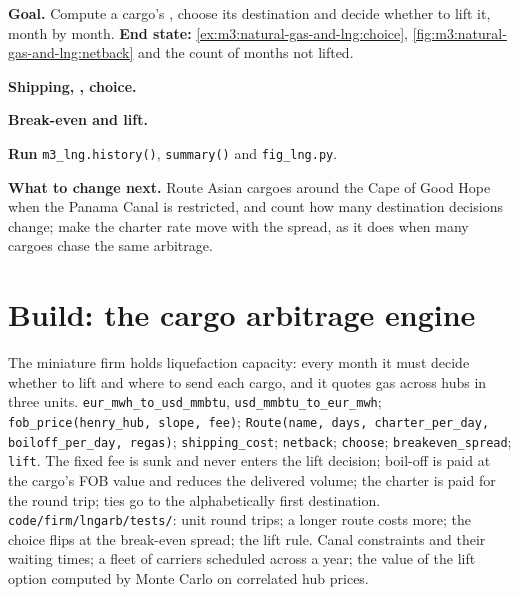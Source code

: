 \begin{tutorial}
\textbf{Goal.} Compute a cargo's , choose its destination and decide whether to
lift it, month by month. \textbf{End state:}
\cref{ex:m3:natural-gas-and-lng:choice}, \cref{fig:m3:natural-gas-and-lng:netback} and
the count of months not lifted.
\begin{tutsteps}
\item \textbf{Shipping, , choice.}
\label{lst:m3:natural-gas-and-lng:netback}
\item \textbf{Break-even and lift.}
\label{lst:m3:natural-gas-and-lng:lift}
\item \textbf{Run} \texttt{m3\_lng.history()}, \texttt{summary()} and \texttt{fig\_lng.py}.
\end{tutsteps}
\textbf{What to change next.} Route Asian cargoes around the Cape of Good Hope when the
Panama Canal is restricted, and count how many destination decisions change; make the
charter rate move with the spread, as it does when many cargoes chase the same arbitrage.
\end{tutorial}

\section{Build: the cargo arbitrage engine}\label{bld:m3:natural-gas-and-lng:lngarb}

\begin{build}
 The miniature firm holds liquefaction capacity: every month it must
decide whether to lift and where to send each cargo, and it quotes gas across hubs in
three units.
 \texttt{eur\_mwh\_to\_usd\_mmbtu}, \texttt{usd\_mmbtu\_to\_eur\_mwh};
\texttt{fob\_price(henry\_hub, slope, fee)}; \texttt{Route(name, days, charter\_per\_day,
boiloff\_per\_day, regas)}; \texttt{shipping\_cost}; \texttt{netback}; \texttt{choose};
\texttt{breakeven\_spread}; \texttt{lift}.
 The fixed fee is sunk and never enters the lift decision; boil-off is paid
at the cargo's FOB value and reduces the delivered volume; the charter is paid for the
round trip; ties go to the alphabetically first destination.
 \texttt{code/firm/lngarb/tests/}: unit round trips; a longer
route costs more; the choice flips at the break-even spread; the lift rule.
 Canal constraints and their waiting times; a fleet of carriers
scheduled across a year; the value of the lift option computed by Monte Carlo on
correlated hub prices.
\end{build}

